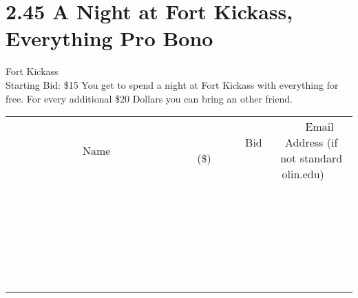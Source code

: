 \documentclass[11pt]{article}
\begin{document}
\section*{2.45 A Night at Fort Kickass, Everything Pro Bono }
Fort Kickass
\\
Starting Bid: \$15
\newline
You get to spend a night at Fort Kickass with everything for free. For every additional \$20 Dollars you can bring an other friend.
\\[6ex]
\begin{tabular}{c c c}
~~~~~~~~~~~~~Name~~~~~~~~~~~~~ & ~~~~~~~~~Bid (\$)~~~~~~~~~  & ~~~Email Address (if not standard olin.edu)~~~\\
 & & \\
\hline
 & & \\
\hline
 & & \\
\hline
 & & \\
\hline
 & & \\
\hline
 & & \\
\hline
 & & \\
\hline
 & & \\
\hline
 & & \\
\hline
 & & \\
\hline
 & & \\
\hline
 & & \\
\hline
 & & \\
\hline
 & & \\
\hline
 & & \\
\hline
 & & \\
\hline
 & & \\
\hline
 & & \\
\hline
 & & \\
\hline
 & & \\
\hline
 & & \\
\hline
 & & \\
\hline
 & & \\
\hline
 & & \\
\hline
 & & \\
\hline
 & & \\
\hline
\end{tabular}
\newpage
\end{document}

